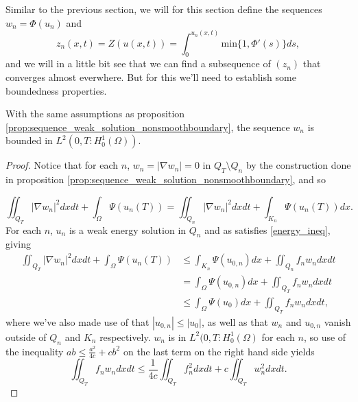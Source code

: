 \documentclass[11pt, a4paper]{article}
\begin{document}
Similar to the previous section, we will for this section define the sequences $w_n = \Phi(u_n)$ and
\begin{equation}
z_n(x,t) = Z(u(x,t)) = \int_0^{u_n(x,t)} \mathrm{min}\{1, \Phi'(s)\} ds,
\end{equation}
and we will in a little bit see that we can find a subsequence of $(z_n)$ that converges almost everwhere. But for this we'll need to establish some boundedness properties.

\begin{proposition}
\label{prop:w_n_nonsmooth_spatial_boundedness}
With the same assumptions as proposition \ref{prop:sequence_weak_solution_nonsmoothboundary}, the sequence $w_n$ is bounded in $L^2(0,T: H_0^1(\Omega))$.
\end{proposition}
\begin{proof}
Notice that for each $n$, $w_n= |\nabla w_n|=0$ in $Q_T\setminus Q_n$ by the construction done in proposition \ref{prop:sequence_weak_solution_nonsmoothboundary}, and so

\begin{equation*}
\iint_{Q_T} |\nabla w_n|^2dxdt + \int_\Omega \Psi(u_n(T)) = \iint_{Q_n}|\nabla w_n|^2dxdt + \int_{K_n} \Psi(u_n(T))dx.
\end{equation*}
For each $n$, $u_n$ is a weak energy solution in $Q_n$ and as satisfies \ref{energy_ineq}, giving
\begin{align}
\label{step_spatial_bound_z_nonsmooth_boundary}
\iint_{Q_T} |\nabla w_n|^2dxdt + \int_\Omega \Psi(u_n(T)) &\leq \int_{K_n}\Psi(u_{0,n})dx + \iint_{Q_n}f_n w_n dxdt \nonumber \\
&= \int_\Omega \Psi(u_{0,n})dx + \iint_{Q_T} f_n w_n dxdt \nonumber\\
& \leq \int_\Omega \Psi(u_0)dx + \iint_{Q_T} f_n w_n dxdt,
\end{align}
where we've also made use of that $|u_{0,n}| \leq |u_0|$, as well as that $w_n$ and $u_{0,n}$ vanish outside of $Q_n$ and $K_n$ respectively.
$w_n$ is in $L^2(0,T:H_0^1(\Omega)$ for each $n$, so use of the inequality $ab \leq \frac{a^2}{4c} + cb^2$ on the last term on the right hand side yields
\begin{equation*}
\iint_{Q_T} f_n w_n dxdt \leq \frac{1}{4c}\iint_{Q_T}f_n^2dxdt + c\iint_{Q_T} w_n^2 dxdt.
\end{equation*}


\end{proof}
\end{document}
